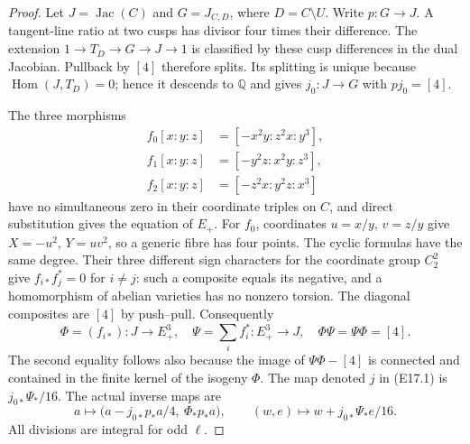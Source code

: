\documentclass[11pt,oneside]{article}
\DeclareMathOperator{\Hom}{Hom}
\DeclareMathOperator{\Jac}{Jac}
\begin{document}
\begin{proof}
Let $J=\Jac(C)$ and $G=J_{C,D}$, where $D=C\setminus U$.
Write $p:G\to J$. A tangent-line ratio at two cusps has
divisor four times their difference. The extension
$1\to T_D\to G\to J\to1$ is classified by these cusp
differences in the dual Jacobian. Pullback by $[4]$
therefore splits. Its splitting is unique because
$\Hom(J,T_D)=0$; hence it descends to $\mathbb Q$ and
gives $j_0:J\to G$ with $pj_0=[4]$.

The three morphisms
\[
 \begin{aligned}
 f_0[x:y:z]&=[-x^2y:z^2x:y^3],\\
 f_1[x:y:z]&=[-y^2z:x^2y:z^3],\\
 f_2[x:y:z]&=[-z^2x:y^2z:x^3]
 \end{aligned}
 \tag{E17.2}
\]
have no simultaneous zero in their coordinate triples
on $C$, and direct substitution gives the equation of
$E_+$. For $f_0$, coordinates $u=x/y$, $v=z/y$ give
$X=-u^2$, $Y=uv^2$, so a generic fibre has four points.
The cyclic formulas have the same degree. Their three
different sign characters for the coordinate group
$C_2^2$ give $f_{i*}f_j^*=0$ for $i\ne j$: such a
composite equals its negative, and a homomorphism of
abelian varieties has no nonzero torsion. The diagonal
composites are $[4]$ by push--pull. Consequently
\[
 \Phi=(f_{i*}):J\to E_+^3,\quad
 \Psi=\sum_i f_i^*:E_+^3\to J,\quad
 \Phi\Psi=\Psi\Phi=[4].
\]
The second equality follows also because the image of
$\Psi\Phi-[4]$ is connected and contained in the finite
kernel of the isogeny $\Phi$. The map denoted $j$ in
(E17.1) is $j_{0*}\Psi_*/16$. The actual inverse maps are
\[
 a\longmapsto
 \bigl(a-j_{0*}p_*a/4,\ \Phi_*p_*a\bigr),
 \qquad
 (w,e)\longmapsto w+j_{0*}\Psi_*e/16.
 \tag{E17.3}
\]
All divisions are integral for odd $\ell$.


\end{proof}
\end{document}
